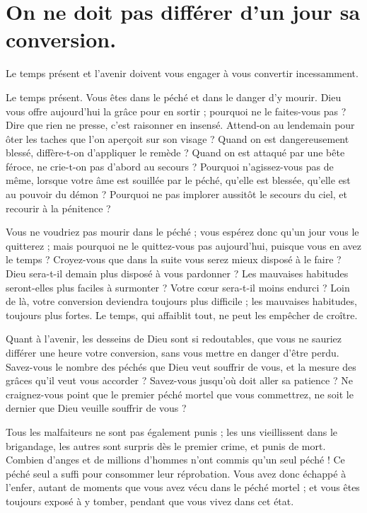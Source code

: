 \documentclass[instructions.tex]{subfiles}
\begin{document}
\chapter{On ne doit pas différer d’un jour sa conversion.}

Le temps présent et l’avenir doivent vous engager à vous convertir incessamment.

\primo Le temps présent. Vous êtes dans le péché et dans le danger d’y mourir. Dieu vous offre aujourd’hui la grâce pour en sortir ; pourquoi ne le faites-vous pas ? Dire que rien ne presse, c’est raisonner en insensé. Attend-on au lendemain pour ôter les taches que l’on aperçoit sur son visage ? Quand on est dangereusement blessé, diffère-t-on d’appliquer le remède ? Quand on est attaqué par une bête féroce, ne crie-t-on pas d’abord au secours ? Pourquoi n’agissez-vous pas de même, lorsque votre âme est souillée par le péché, qu’elle est blessée, qu’elle est au pouvoir du démon ? Pourquoi ne pas implorer aussitôt le secours du ciel, et recourir à la pénitence ?

Vous ne voudriez pas mourir dans le péché ; vous espérez donc qu’un jour vous le quitterez ; mais pourquoi ne le quittez-vous pas aujourd’hui, puisque vous en avez le temps ? Croyez-vous que dans la suite vous serez mieux disposé à le faire ? Dieu sera-t-il demain plus disposé à vous pardonner ? Les mauvaises habitudes seront-elles plus faciles à surmonter ? Votre cœur sera-t-il moins endurci ? Loin de là, votre conversion deviendra toujours plus difficile ; les mauvaises habitudes, toujours plus fortes. Le temps, qui affaiblit tout, ne peut les empêcher de croître.

\secundo Quant à l’avenir, les desseins de Dieu sont si redoutables, que vous ne sauriez différer une heure votre conversion, sans vous mettre en danger d’être perdu. Savez-vous le nombre des péchés que Dieu veut souffrir de vous, et la mesure des grâces qu’il veut vous accorder ? Savez-vous jusqu’où doit aller sa patience ? Ne craignez-vous point que le premier péché mortel que vous commettrez, ne soit le dernier que Dieu veuille souffrir de vous ?

Tous les malfaiteurs ne sont pas également punis ; les uns vieillissent dans le brigandage, les autres sont surpris dès le premier crime, et punis de mort. Combien d’anges et de millions d’hommes n’ont commis qu’un seul péché ! Ce péché seul a suffi pour consommer leur réprobation. Vous avez donc échappé à l’enfer, autant de moments que vous avez vécu dans le péché mortel ; et vous êtes toujours exposé à y tomber, pendant que vous vivez dans cet état.
\end{document}
